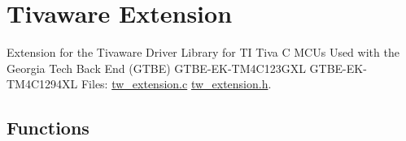 \hypertarget{group__tivaware__extension}{\section{Tivaware Extension}
\label{group__tivaware__extension}
}


Extension for the Tivaware Driver Library for T\+I Tiva C M\+C\+Us Used with the Georgia Tech Back End (G\+T\+B\+E) G\+T\+B\+E-\/\+E\+K-\/\+T\+M4\+C123\+G\+X\+L G\+T\+B\+E-\/\+E\+K-\/\+T\+M4\+C1294\+X\+L Files\+: \hyperlink{tw__extension_8c_source}{tw\+\_\+extension.\+c} \hyperlink{tw__extension_8h_source}{tw\+\_\+extension.\+h}.  


\subsection*{Functions}
